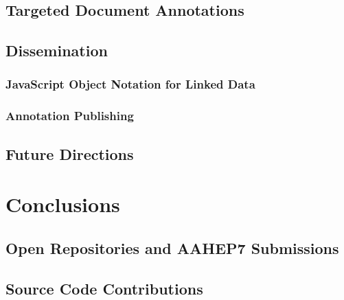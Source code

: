 \documentclass[12pt,a4paper]{report}
\begin{document}
    \section{Targeted Document Annotations}
      \label{sec:notes}
      

    \clearpage

    \section{Dissemination}
      \label{sec:diss}
      

      \subsection{JavaScript Object Notation for Linked Data}
        \label{sec:json}
        

      \clearpage

      \subsection{Annotation Publishing}
        \label{sec:pub}
        

    \clearpage

    \section{Future Directions}
        \label{sec:future}
        

  \cleardoublepage

  \chapter{Conclusions}
    \label{sec:outro}
    

  \cleardoublepage

  
  

  \cleardoublepage

  \appendixpage
  \addappheadtotoc

  \cleardoublepage

  \appendix

    \renewcommand\thesection{\Alph{section}}

    \section{Open Repositories and AAHEP7 Submissions}
      \label{apx:or2014}
      

    \cleardoublepage

    \section{Source Code Contributions}
      \label{apx:code}
      
\end{document}
